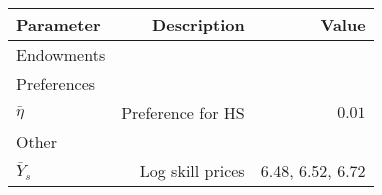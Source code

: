 \begin{tabular}{lrr}
\hline
Parameter & Description  & Value  \\ 
\hline
Endowments &   &   \\ 
Preferences &   &   \\ 
$\bar{\eta}$ & Preference for HS  & $0.01$  \\ 
Other &   &   \\ 
$\bar{Y}_{s}$ & Log skill prices  & 6.48, 6.52, 6.72  \\ 
\hline
\end{tabular}%
